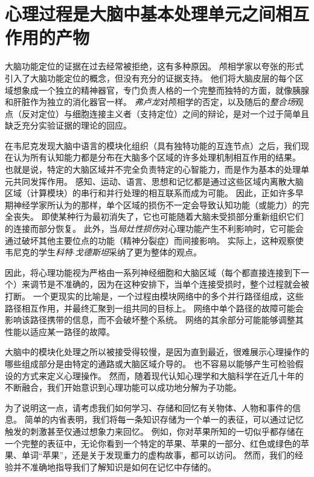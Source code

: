 \section{心理过程是大脑中基本处理单元之间相互作用的产物}

大脑功能定位的证据在过去经常被拒绝，这有多种原因。
颅相学家以夸张的形式引入了大脑功能定位的概念，但没有充分的证据支持。
他们将大脑皮层的每个区域想象成一个独立的精神器官，专门负责人格的一个完整而独特的方面，就像胰腺和肝脏作为独立的消化器官一样。
\textit{弗卢龙}对颅相学的否定，以及随后的\textit{整合场}观点（反对定位）与细胞连接主义者（支持定位）之间的辩论，是对一个过于简单且缺乏充分实验证据的理论的回应。


在韦尼克发现大脑中语言的模块化组织（具有独特功能的互连节点）之后，我们现在认为所有认知能力都是分布在大脑多个区域的许多处理机制相互作用的结果。
也就是说，特定的大脑区域并不完全负责特定的心智能力，而是作为基本的处理单元共同发挥作用。
感知、运动、语言、思想和记忆都是通过这些区域内离散大脑区域（计算模块）的串行和并行处理的相互联系而成为可能。
因此，正如许多早期神经学家所认为的那样，单个区域的损伤不一定会导致认知功能（或能力）的完全丧失。
即使某种行为最初消失了，它也可能随着大脑未受损部分重新组织它们的连接而部分恢复。
此外，当\textit{局灶性损伤}对心理功能产生不利影响时，它可能会通过破坏其他主要位点的功能（精神分裂症）而间接影响。
实际上，这种观察使韦尼克的学生\textit{科特$\cdot$戈德斯坦}采纳了更为整体的观点。



因此，将心理功能视为严格由一系列神经细胞和大脑区域（每个都直接连接到下一个）来调节是不准确的，因为在这种安排下，当单个连接受损时，整个过程就会被打断。
一个更现实的比喻是，一个过程由模块网络中的多个并行路径组成，这些路径相互作用，并最终汇聚到一组共同的目标上。
网络中单个路径的故障可能会影响该路径携带的信息，而不会破坏整个系统。
网络的其余部分可能能够调整其性能以适应某一路径的故障。



大脑中的模块化处理之所以被接受得较慢，是因为直到最近，很难展示心理操作的哪些组成部分是由特定的通路或大脑区域介导的。
也不容易以能够产生可检验假设的方式来定义心理操作。
然而，随着现代认知心理学和大脑科学在近几十年的不断融合，我们开始意识到心理功能可以成功地分解为子功能。


为了说明这一点，请考虑我们如何学习、存储和回忆有关物体、人物和事件的信息。
简单的内省表明，我们将每一条知识存储为一个单一的表征，可以通过记忆触发的刺激甚至仅通过想象力来回忆。
例如，你对苹果所知的一切似乎都存储在一个完整的表征中，无论你看到一个特定的苹果、苹果的一部分、红色或绿色的苹果、单词“苹果”，还是关于发现重力的虚构故事，都可以访问。
然而，我们的经验并不准确地指导我们了解知识是如何在记忆中存储的。





